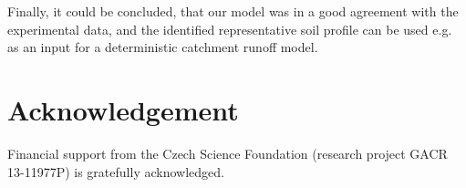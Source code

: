 \documentclass[review]{myarticle}
\begin{document}
Finally, it could be concluded, that our model was in a good agreement with the experimental data, and the identified representative soil profile can be used e.g. as an input for a deterministic catchment runoff model.

\section{Acknowledgement}

Financial support from the Czech Science Foundation (research project GACR 13-11977P) is gratefully acknowledged.



\end{document}

